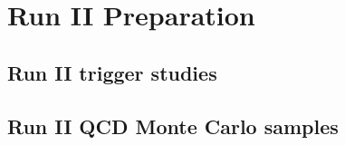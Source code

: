 \chapter{Run II Preparation}

\section{Run II trigger studies}

\section{Run II QCD Monte Carlo samples}

% 
% 
% 
% 



